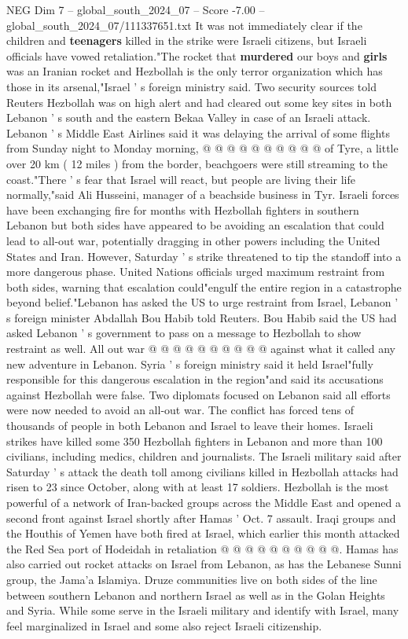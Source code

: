\begin{textsample}{NEG Dim 7 – global\_south\_2024\_07 – Score -7.00 – global\_south\_2024\_07/111337651.txt}
It was not immediately clear if the children and \textbf{teenagers} killed in the strike were Israeli citizens, but Israeli officials have vowed retaliation."The rocket that \textbf{murdered} our boys and \textbf{girls} was an Iranian rocket and Hezbollah is the only terror organization which has those in its arsenal,"Israel ' s foreign ministry said.
Two security sources told Reuters Hezbollah was on high alert and had cleared out some key sites in both Lebanon ' s south and the eastern Bekaa Valley in case of an Israeli attack.
Lebanon ' s Middle East Airlines said it was delaying the arrival of some flights from Sunday night to Monday morning, @ @ @ @ @ @ @ @ @ @ of Tyre, a little over 20 km ( 12 miles ) from the border, beachgoers were still streaming to the coast."There ' s fear that Israel will react, but people are living their life normally,"said Ali Husseini, manager of a beachside business in Tyr.
Israeli forces have been exchanging fire for months with Hezbollah fighters in southern Lebanon but both sides have appeared to be avoiding an escalation that could lead to all-out war, potentially dragging in other powers including the United States and Iran.
However, Saturday ' s strike threatened to tip the standoff into a more dangerous phase.
United Nations officials urged maximum restraint from both sides, warning that escalation could"engulf the entire region in a catastrophe beyond belief."Lebanon has asked the US to urge restraint from Israel, Lebanon ' s foreign minister Abdallah Bou Habib told Reuters.
Bou Habib said the US had asked Lebanon ' s government to pass on a message to Hezbollah to show restraint as well.
All out war @ @ @ @ @ @ @ @ @ @ against what it called any new adventure in Lebanon.
Syria ' s foreign ministry said it held Israel"fully responsible for this dangerous escalation in the region"and said its accusations against Hezbollah were false.
Two diplomats focused on Lebanon said all efforts were now needed to avoid an all-out war.
The conflict has forced tens of thousands of people in both Lebanon and Israel to leave their homes.
Israeli strikes have killed some 350 Hezbollah fighters in Lebanon and more than 100 civilians, including medics, children and journalists.
The Israeli military said after Saturday ' s attack the death toll among civilians killed in Hezbollah attacks had risen to 23 since October, along with at least 17 soldiers.
Hezbollah is the most powerful of a network of Iran-backed groups across the Middle East and opened a second front against Israel shortly after Hamas ' Oct. 7 assault.
Iraqi groups and the Houthis of Yemen have both fired at Israel, which earlier this month attacked the Red Sea port of Hodeidah in retaliation @ @ @ @ @ @ @ @ @ @.
Hamas has also carried out rocket attacks on Israel from Lebanon, as has the Lebanese Sunni group, the Jama'a Islamiya.
Druze communities live on both sides of the line between southern Lebanon and northern Israel as well as in the Golan Heights and Syria.
While some serve in the Israeli military and identify with Israel, many feel marginalized in Israel and some also reject Israeli citizenship.

\end{textsample}
